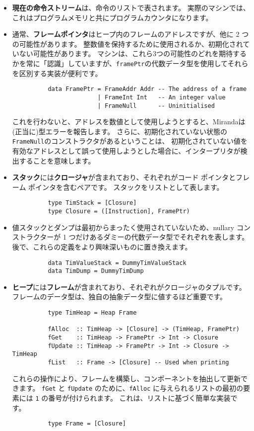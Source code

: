 \documentclass{jarticle}
\begin{document}
\begin{itemize}
	\item \textbf{現在の命令ストリーム}は、命令のリストで表されます。
	      実際のマシンでは、これはプログラムメモリと共にプログラムカウンタになります。
	\item 通常、\textbf{フレームポインタ}はヒープ内のフレームのアドレスですが、他に 2 つの可能性があります。
	      整数値を保持するために使用されるか、初期化されていない可能性があります。
	      マシンは、これら3つの可能性のどれを期待するかを常に「認識」していますが、\texttt{framePtr}の代数データ型を使用してそれらを区別する実装が便利です。
	      \begin{verbatim}
          data FramePtr = FrameAddr Addr -- The address of a frame
                        | FrameInt Int   -- An integer value
                        | FrameNull      -- Uninitialised
        \end{verbatim}
	      これを行わないと、アドレスを数値として使用しようとすると、Mirandaは(正当に)型エラーを報告します。
	      さらに、初期化されていない状態の \texttt{FrameNull}のコンストラクタがあるということは、
	      初期化されていない値を有効なアドレスとして誤って使用しようとした場合に、インタープリタが検出することを意味します。
	\item \textbf{スタック}には\textbf{クロージャ}が含まれており、それぞれがコード ポインタとフレーム ポインタを含むペアです。
	      スタックをリストとして表します。
	      \begin{verbatim}
          type TimStack = [Closure]
          type Closure = ([Instruction], FramePtr)
        \end{verbatim}
	\item 値スタックとダンプは最初からまったく使用されていないため、nullary コンストラクターが 1 つだけあるダミーの代数データ型でそれぞれを表します。
	      後で、これらの定義をより興味深いものに置き換えます。
	      \begin{verbatim}
          data TimValueStack = DummyTimValueStack
          data TimDump = DummyTimDump
        \end{verbatim}
	\item \textbf{ヒープ}には\textbf{フレーム}が含まれており、それぞれがクロージャのタプルです。
	      フレームのデータ型は、独自の抽象データ型に値するほど重要です。
	      \begin{verbatim}
          type TimHeap = Heap Frame

          fAlloc  :: TimHeap -> [Closure] -> (TimHeap, FramePtr)
          fGet    :: TimHeap -> FramePtr -> Int -> Closure
          fUpdate :: TimHeap -> FramePtr -> Int -> Closure -> TimHeap
          fList   :: Frame -> [Closure] -- Used when printing
        \end{verbatim}
	      これらの操作により、フレームを構築し、コンポーネントを抽出して更新できます。
	      \texttt{fGet} と \texttt{fUpdate} のために、\texttt{fAlloc} に与えられるリストの最初の要素には \texttt{1} の番号が付けられます。
	      これは、リストに基づく簡単な実装です。
	      \begin{verbatim}
          type Frame = [Closure]


\end{verbatim}
\end{itemize}
\end{document}
